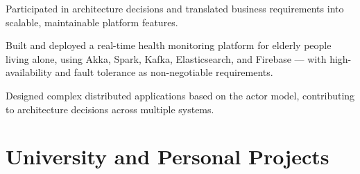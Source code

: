 \documentclass[]{plushcv}
\begin{document}
\begin{minipage}[t]{0.74\textwidth}
\begin{tightemize}
\item Participated in architecture decisions and translated business requirements into scalable, maintainable platform features.
\end{tightemize}
\sectionsep
\sectionsep

\hfill
{}
\vspace{5pt}
\begin{tightemize}
\sectionsep
\item Built and deployed a real-time health monitoring platform for elderly people living alone, using Akka, Spark, Kafka, Elasticsearch, and Firebase — with high-availability and fault tolerance as non-negotiable requirements.
\item Designed complex distributed applications based on the actor model, contributing to architecture decisions across multiple systems.
\end{tightemize}







\section{University and Personal Projects}

\hfill
{}


\end{minipage}
\end{document}
